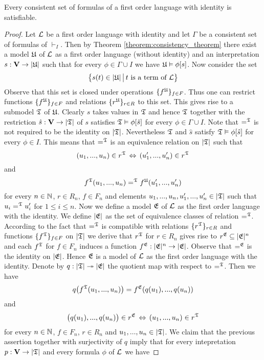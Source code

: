 \begin{theorem}\label{theorem:consistency_theorem_for_languages_with_identity}
Every consistent set of formulas of a first order language with identity is satisfiable.
\end{theorem}
\begin{proof}
Let ${\mathcal L}$ be a first order language with identity and let $\Gamma$ be a consistent set of formulas of $\vdash_I$. Then by Theorem \ref{theorem:consistency_theorem} there exist a model ${\mathfrak U}$ of ${\mathcal L}$ as a first order language (without identity) and an interpretation $s:\mathbf{V}\rightarrow |{\mathfrak U}|$ such that for every $\phi \in \Gamma\cup I$ we have ${\mathfrak U}\vDash \phi[s]$. Now consider the set
$$\big\{s(t)\in |{\mathfrak U}|\,\big|\,\mbox{$t$ is a term of ${\mathcal L}$}\big\}$$
Observe that this set is closed under operations $\{f^{\mathfrak U}\}_{f\in F}$. Thus one can restrict functions $\{f^{\mathfrak U}\}_{f\in F}$ and relations $\{r^{{\mathfrak U}}\}_{r\in R}$ to this set. This gives rise to a submodel ${\mathfrak T}$ of ${\mathfrak U}$. Clearly $s$ takes values in ${\mathfrak T}$ and hence ${\mathfrak T}$ together with the restriction $\hat{s}:\mathbf{V}\rightarrow |{\mathfrak T}|$ of $s$ satisfies ${\mathfrak T} \vDash \phi[\hat{s}]$ for every $\phi \in \Gamma \cup I$. Note that $=^{\mathfrak T}$ is not required to be the identity on $|{\mathfrak T}|$. Nevertheless ${\mathfrak T}$ and $\hat{s}$ satisfy ${\mathfrak T} \vDash \phi[\hat{s}]$ for every $\phi \in I$. This means that $=^{\mathfrak T}$ is an equivalence relation on $|{\mathfrak T}|$ such that
$$(u_1,...,u_n)\in r^{{\mathfrak T}}\,\Leftrightarrow\,(u'_1,...,u'_n)\in r^{{\mathfrak T}}$$
and
$$f^{{\mathfrak T}}(u_1,...,u_n) =^{{\mathfrak T}} f^{{\mathfrak U}}(u'_1,...,u'_n)$$
for every $n\in {\mathbb N}$, $r\in R_n$, $f\in F_n$ and elements $u_1,...,u_n,u'_1,...,u'_n \in |{\mathfrak T}|$ such that $u_i =^{{\mathfrak T}} u'_i$ for $1\leq i\leq n$. Now we define a model ${\mathfrak E}$ of ${\mathcal L}$ as the first order language with the identity. We define $|{\mathfrak E}|$ as the set of equivalence classes of relation $=^{{\mathfrak T}}$. According to the fact that $=^{{\mathfrak T}}$ is compatible with relations $\{r^{{\mathfrak T}}\}_{r\in R}$ and functions $\{f^{{\mathfrak T}}\}_{f\in F}$ on $|{\mathfrak T}|$ we derive that $r^{\mathfrak T}$ for $r\in R_n$ gives rise to $r^{\mathfrak E}\subseteq |{\mathfrak E}|^n$ and each $f^{{\mathfrak T}}$ for $f\in F_n$ induces a function $f^{\mathfrak E}:|{\mathfrak E}|^n\rightarrow |{\mathfrak E}|$. Observe that $=^{\mathfrak E}$ is the identity on $|{\mathfrak E}|$. Hence ${\mathfrak E}$ is a model of ${\mathcal L}$ as the first order language with the identity. Denote by $q:|{\mathfrak T}|\twoheadrightarrow |{\mathfrak E}|$ the quotient map with respect to $=^{{\mathfrak T}}$. Then we have
$$q\big(f^{{\mathfrak T}}(u_1,...,u_n)\big) = f^{{\mathfrak E}}(q(u_1),...,q(u_n))$$
and
$$\big(q(u_1),...,q(u_n)\big)\in r^{{\mathfrak E}}\,\Leftrightarrow\,(u_1,...,u_n)\in r^{{\mathfrak T}}$$
for every $n\in {\mathbb N}$, $f\in F_n$, $r\in R_n$ and $u_1,...,u_n\in |{\mathfrak T}|$. We claim that the previous assertion together with surjectivity of $q$ imply that for every intepretation $p:\mathbf{V}\rightarrow |{\mathfrak T}|$ and every formula $\phi$ of ${\mathcal L}$ we have

\end{proof}
